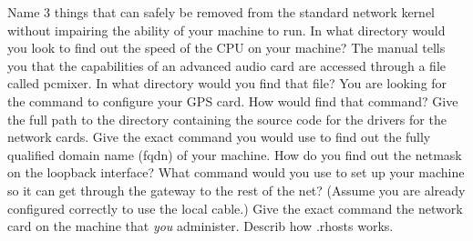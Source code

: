 Name 3 things that can safely be removed from the standard
network kernel without impairing the ability of your
machine to run.
\vfill\eject
\ques
In what directory  would you look to find out the speed of the
CPU on your machine?
\vskip 0.5in
The manual tells you that the capabilities of an advanced audio card
are accessed through a file called {\ltt{}pcmixer}.
In what directory would you find that file?
\vskip 0.5in
You are looking for the command to configure your GPS card.
How would find that command?
\vskip 0.5in
\ques
Give the full path to the directory containing the source code for the
drivers for the network cards.
\vskip 0.5in
Give the exact command you would use to find out
the fully qualified domain name ({\ltt{}fqdn}) of your machine.
\vskip 0.5in
How do you find out the netmask on the loopback interface?
\vskip 0.5in
\ques
What command would you use to set up your machine so
it can get through the gateway to the rest of the net?
(Assume you are already configured correctly to use the
local cable.)
\vskip 0.5in
Give the exact command the network card on the machine
that {\it you} administer.
\vskip 0.5in
Describ how {\ltt{}.rhosts} works.
\vskip 0.5in
\bye
